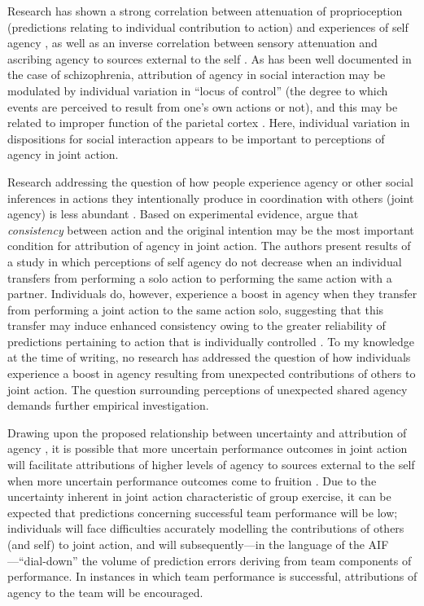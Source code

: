 \begin{CJK}{UTF8}{gbsn}
Research has shown a strong correlation between attenuation of proprioception (predictions relating to individual contribution to action) and experiences of self agency \citep{Wolpert2003,Sato2008}, as well as an inverse correlation between sensory attenuation and ascribing agency to sources external to the self \citep{Brown2013}.  As has been well documented in the case of schizophrenia, attribution of agency in social interaction may be modulated by individual variation in ``locus of control'' (the degree to which events are perceived to result from one's own actions or not), and this may be related to improper function of the parietal cortex \citep{Frith2000}.  Here, individual variation in dispositions for social interaction appears to be important to perceptions of agency in joint action.


Research addressing the question of how people experience agency or other social inferences in actions they intentionally produce in coordination with others (joint agency) is less abundant \citep[but see][]{VanderWel2012,VanderWel2013}. Based on experimental evidence, \textcite{VanderWel2012} argue that \textit{consistency} between action and the original intention may be the most important condition for attribution of agency in joint action.  The authors present results of a study in which perceptions of self agency do not decrease when an individual transfers from performing a solo action to performing the same action with a partner.  Individuals do, however, experience a boost in agency when they transfer from performing a joint action to the same action solo, suggesting that this transfer may induce enhanced consistency owing to the greater reliability of predictions pertaining to action that is individually controlled \citep{VanderWel2012}.  To my knowledge at the time of writing, no research has addressed the question of how individuals experience a boost in agency resulting from unexpected contributions of others to joint action.  The question surrounding perceptions of unexpected shared agency demands further empirical investigation.

Drawing upon the proposed relationship between uncertainty and attribution of agency \citep{Frith2007}, it is possible that more uncertain performance outcomes in joint action will facilitate attributions of higher levels of agency to sources external to the self when more uncertain performance outcomes come to fruition \citep{Sato2005}.  Due to the uncertainty inherent in joint action characteristic of group exercise, it can be expected that predictions concerning successful team performance will be low; individuals will face difficulties accurately modelling the contributions of others (and self) to joint action, and will subsequently---in the language of the AIF---``dial-down'' the volume of prediction errors deriving from team components of performance.  In instances in which team performance is successful, attributions of agency to the team will be encouraged.


\end{CJK}
